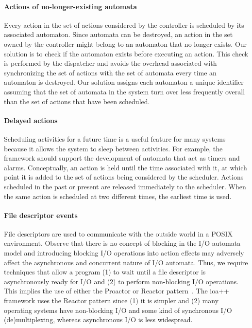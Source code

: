 \paragraph*{Actions of no-longer-existing automata}
Every action in the set of actions considered by the controller is scheduled by its associated automaton.
Since automata can be destroyed, an action in the set owned by the controller might belong to an automaton that no longer exists.
Our solution is to check if the automaton exists before executing an action.
This check is performed by the dispatcher and avoids the overhead associated with synchronizing the set of actions with the set of automata every time an automaton is destroyed.
Our solution assigns each automaton a unique identifier assuming that the set of automata in the system turn over less frequently overall than the set of actions that have been scheduled.

\paragraph*{Delayed actions}
Scheduling activities for a future time is a useful feature for many systems because it allows the system to sleep between activities. For example, the framework should support the development of automata that act as timers and alarms.
Conceptually, an action is held until the time associated with it, at which point it is added to the set of actions being considered by the scheduler.
Actions scheduled in the past or present are released immediately to the scheduler.
When the same action is scheduled at two different times, the earliest time is used.

\paragraph*{File descriptor events}
File descriptors are used to communicate with the outside world in a POSIX environment.
Observe that there is no concept of blocking in the I/O automata model and introducing blocking I/O operations into action effects may adversely affect the asynchronous and concurrent nature of I/O automata.
Thus, we require techniques that allow a program (1) to wait until a file descriptor is asynchronously ready for I/O and (2) to perform non-blocking I/O operations.
This implies the use of either the Proactor or Reactor pattern~\cite{schmidt2000pattern}.
The ioa++ framework uses the Reactor pattern since (1) it is simpler and (2) many operating systems have non-blocking I/O and some kind of synchronous I/O (de)multiplexing, whereas asynchronous I/O is less widespread.

